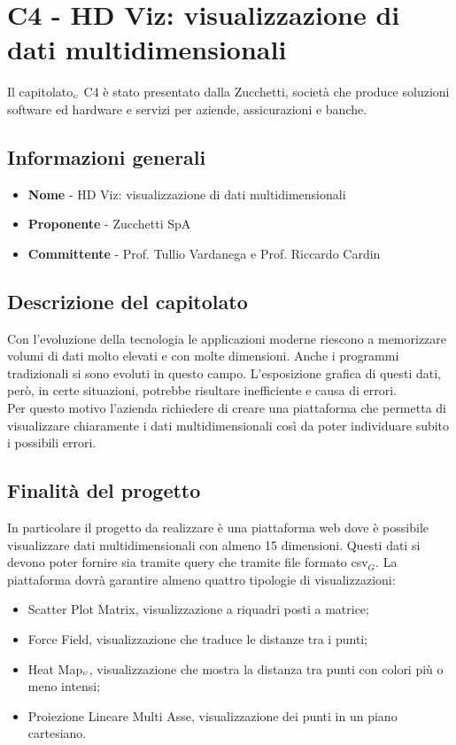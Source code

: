 \chapter{C4 - HD Viz: visualizzazione di dati multidimensionali} \label{CapitolatoC4}
Il capitolato$_{\scaleto{G}{3pt}}$ C4 è stato presentato dalla Zucchetti, società che produce soluzioni software ed hardware e servizi per aziende, assicurazioni e banche.
\section{Informazioni generali} \label{C4InformazioniGenerali}
\begin{itemize}
	\item \textbf{Nome} - HD Viz: visualizzazione di dati multidimensionali
	\item \textbf{Proponente} - Zucchetti SpA
	\item \textbf{Committente} - Prof. Tullio Vardanega e Prof. Riccardo Cardin
\end{itemize}
\section{Descrizione del capitolato} \label{C4DescrizioneDelCapitolato}
Con l'evoluzione della tecnologia le applicazioni moderne riescono a memorizzare volumi di dati molto elevati e con molte dimensioni. Anche i programmi tradizionali si sono evoluti in questo campo. L'esposizione grafica di questi dati, però, in certe situazioni, potrebbe risultare inefficiente e causa di errori. \\
Per questo motivo l'azienda richiedere di creare una piattaforma che permetta di visualizzare chiaramente i dati multidimensionali così da poter individuare subito i possibili errori.
\section{Finalità del progetto} \label{C4FinalitàDelProgetto}
In particolare il progetto da realizzare è una piattaforma web dove è possibile visualizzare dati multidimensionali con almeno 15 dimensioni. Questi dati si devono poter fornire sia tramite query che tramite file formato csv$_G$. La piattaforma dovrà garantire almeno quattro tipologie di visualizzazioni:
\begin{itemize}
	\item Scatter Plot Matrix, visualizzazione a riquadri posti a matrice;
	\item Force Field, visualizzazione che traduce le distanze tra i punti;
	\item Heat Map$_{\scaleto{G}{3pt}}$, visualizzazione che mostra la distanza tra punti con colori più o meno intensi;
	\item Proiezione Lineare Multi Asse, visualizzazione dei punti in un piano cartesiano.
\end{itemize}
